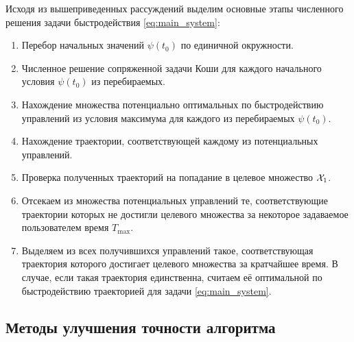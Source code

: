 Исходя из вышеприведенных рассуждений выделим основные этапы численного решения задачи быстродействия \eqref{eq:main_system}:
\begin{enumerate}
        \item Перебор начальных значений $\psi(t_0)$ по единичной окружности.
        \item Численное решение сопряженной задачи Коши для каждого начального условия $\psi(t_0)$ из перебираемых.
        \item Нахождение множества потенциально оптимальных по быстродействию управлений из условия максимума для каждого из перебираемых $\psi(t_0)$.
        \item Нахождение траектории, соответствующей каждому из потенциальных управлений.
        \item Проверка полученных траекторий на попадание в целевое множество $\mathcal{X}_1$.
        \item Отсекаем из множества потенциальных управлений те, соответствующие траектории которых не достигли целевого множества за некоторое задаваемое пользователем время $T_{\max}$.
        \item Выделяем из всех получившихся управлений такое, соответствующая траектория которого достигает целевого множества за кратчайшее время. В случае, если такая траектория единственна, считаем её оптимальной по быстродействию траекторией для задачи \eqref{eq:main_system}.
\end{enumerate}

\subsection{Методы улучшения точности алгоритма}

